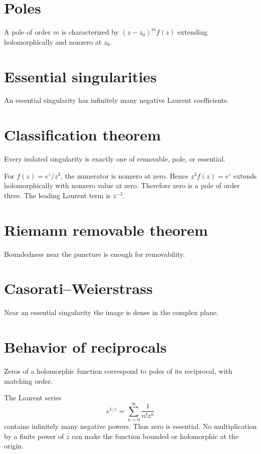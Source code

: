 \section{Poles}
A pole of order $m$ is characterized by $(z-z_0)^mf(z)$ extending holomorphically and nonzero at $z_0$.

\section{Essential singularities}
An essential singularity has infinitely many negative Laurent coefficients.

\section{Classification theorem}
Every isolated singularity is exactly one of removable, pole, or essential.

\begin{example}\label{ex:iv09-expand-02}
For \(f(z)=e^z/z^3\), the numerator is nonzero at zero. Hence \(z^3f(z)=e^z\) extends holomorphically with nonzero value at zero. Therefore zero is a pole of order three. The leading Laurent term is \(z^{-3}\).
\end{example}
\section{Riemann removable theorem}
Boundedness near the puncture is enough for removability.

\section{Casorati--Weierstrass}
Near an essential singularity the image is dense in the complex plane.

\section{Behavior of reciprocals}
Zeros of a holomorphic function correspond to poles of its reciprocal, with matching order.

\begin{example}\label{ex:iv09-expand-03}
The Laurent series
\[
e^{1/z}=\sum_{n=0}^{\infty}\frac{1}{n!z^n}
\]
contains infinitely many negative powers. Thus zero is essential. No multiplication by a finite power of \(z\) can make the function bounded or holomorphic at the origin.
\end{example}
